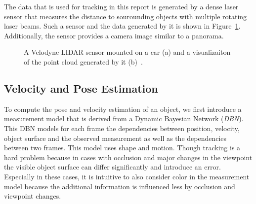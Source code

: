 \documentclass[twoside,a4paper,article]{combine}
\begin{document}
The data that is used for tracking in this report is generated by a
dense laser sensor that measures the distance to sourounding objects
with multiple rotating laser beams. Such a sensor and the data
generated by it is shown in Figure~\ref{fig:lidar}. Additionally, the
sensor provides a camera image similar to a panorama.
\begin{figure}
  \center
  
  \caption{A Velodyne LIDAR sensor mounted on a car (a) and a
    visualizaiton of the point cloud generated by it
    (b)~\cite{arbitrary-object-recognition}.}
  \label{fig:lidar}
\end{figure}

\subsection{Velocity and Pose Estimation}
\label{sub:vel-and-pos-estimation}
To compute the pose and velocity estimation of an object, we first
introduce a measurement model that is derived from a Dynamic Bayesian
Network (\textit{DBN}). This DBN models for each frame the
dependencies between position, velocity, object surface and the
observed measurement as well as the dependencies between two
frames. This model uses shape and motion. Though tracking is a hard
problem because in cases with occlusion and major changes in the
viewpoint the visible object surface can differ significantly and
introduce an error. Especially in these cases, it is intuitive to also
consider color in the measurement model because the additional
information is influenced less by occlusion and viewpoint changes.
\end{document}
